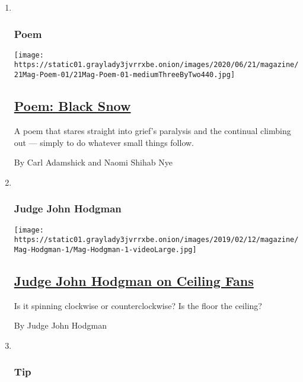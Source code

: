 \begin{enumerate}
\def\labelenumi{\arabic{enumi}.}
\item ~
  \hypertarget{poem}{%
  \subsubsection{Poem}\label{poem}}

  \texttt{[image: https://static01.graylady3jvrrxbe.onion/images/2020/06/21/magazine/21Mag-Poem-01/21Mag-Poem-01-mediumThreeByTwo440.jpg]}

  \hypertarget{poem-black-snow}{%
  \subsection{\texorpdfstring{\href{/2020/06/18/magazine/poem-black-snow.html}{Poem:
  Black Snow}}{Poem: Black Snow}}\label{poem-black-snow}}

  A poem that stares straight into grief's paralysis and the continual
  climbing out --- simply to do whatever small things follow.

  By Carl Adamshick and Naomi Shihab Nye
\item ~
  \hypertarget{judge-john-hodgman}{%
  \subsubsection{Judge John Hodgman}\label{judge-john-hodgman}}

  \texttt{[image: https://static01.graylady3jvrrxbe.onion/images/2019/02/12/magazine/Mag-Hodgman-1/Mag-Hodgman-1-videoLarge.jpg]}

  \hypertarget{judge-john-hodgman-on-ceiling-fans}{%
  \subsection{\texorpdfstring{\href{/2020/06/18/magazine/judge-john-hodgman-on-ceiling-fans.html}{Judge
  John Hodgman on Ceiling
  Fans}}{Judge John Hodgman on Ceiling Fans}}\label{judge-john-hodgman-on-ceiling-fans}}

  Is it spinning clockwise or counterclockwise? Is the floor the
  ceiling?

  By Judge John Hodgman
\item ~
  \hypertarget{tip}{%
  \subsubsection{Tip}\label{tip}}


\end{enumerate}
